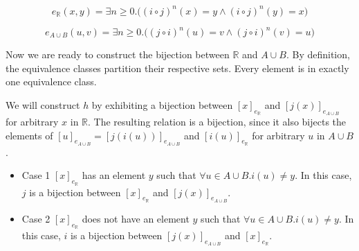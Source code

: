 \documentclass{exam}
\begin{document}
\begin{questions}
\[
e_\mathbb{R}(x, y) = \exists n \geq 0. \big((i \circ j)^n(x)=y \wedge (i \circ j)^n(y)=x \big)
\]

\[
e_{A\cup B}(u, v) = \exists n \geq 0. \big((j \circ i)^n(u)=v \wedge (j \circ i)^n(v)=u\big) 
\]

Now we are ready to construct the bijection between $\mathbb{R}$ and $A \cup B$. By definition, the equivalence classes partition their respective sets. Every element is in exactly one equivalence class.

We will construct $h$ by exhibiting a bijection between $[x]_{e_\mathbb{R}}$ and $[j(x)]_{e_{A\cup B}}$ for arbitrary $x$ in $\mathbb{R}$. The resulting relation is a bijection, since it also bijects the elements of $[u]_{e_{A\cup B}} = [j(i(u))]_{e_{A\cup B}}$ and $[i(u)]_{e_\mathbb{R}}$ for arbitrary $u$ in $A \cup B$.

\begin{itemize}
\item Case 1
$[x]_{e_\mathbb{R}}$ has an element $y$ such that $\forall u \in A\cup B. i(u) \neq y$. In this case, $j$ is a bijection between $[x]_{e_\mathbb{R}}$ and $[j(x)]_{e_{A\cup B}}$.
\item Case 2 $[x]_{e_\mathbb{R}}$ does not have an element $y$ such that $\forall u \in A\cup B. i(u) \neq y$. In this case, $i$ is a bijection between $[j(x)]_{e_{A\cup B}}$ and $[x]_{e_\mathbb{R}}$.
\end{itemize}

\end{questions}
\end{document}
